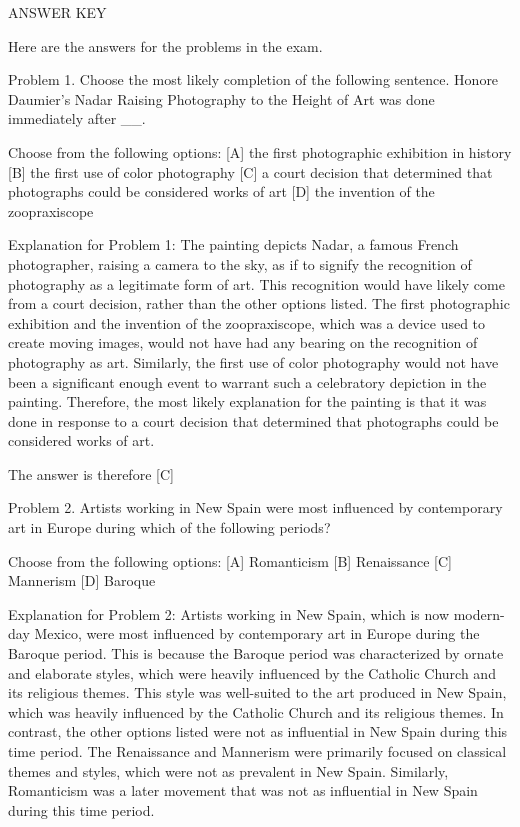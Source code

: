 \documentclass{article}
\begin{document}
\begin{monobox}
ANSWER KEY

Here are the answers for the problems in the exam.

Problem 1.
Choose the most likely completion of the following sentence. Honore Daumier’s Nadar Raising Photography to the Height of Art was done immediately after \_\_.

Choose from the following options:
[A] the first photographic exhibition in history
[B] the first use of color photography
[C] a court decision that determined that photographs could be considered works of art
[D] the invention of the zoopraxiscope

Explanation for Problem 1: The painting depicts Nadar, a famous French photographer, raising a camera to the sky, as if to signify the recognition of photography as a legitimate form of art. This recognition would have likely come from a court decision, rather than the other options listed. The first photographic exhibition and the invention of the zoopraxiscope, which was a device used to create moving images, would not have had any bearing on the recognition of photography as art. Similarly, the first use of color photography would not have been a significant enough event to warrant such a celebratory depiction in the painting. Therefore, the most likely explanation for the painting is that it was done in response to a court decision that determined that photographs could be considered works of art.

The answer is therefore [C]

Problem 2.
Artists working in New Spain were most influenced by contemporary art in Europe during which of the following periods?

Choose from the following options:
[A] Romanticism
[B] Renaissance
[C] Mannerism
[D] Baroque

Explanation for Problem 2: Artists working in New Spain, which is now modern-day Mexico, were most influenced by contemporary art in Europe during the Baroque period. This is because the Baroque period was characterized by ornate and elaborate styles, which were heavily influenced by the Catholic Church and its religious themes. This style was well-suited to the art produced in New Spain, which was heavily influenced by the Catholic Church and its religious themes. In contrast, the other options listed were not as influential in New Spain during this time period. The Renaissance and Mannerism were primarily focused on classical themes and styles, which were not as prevalent in New Spain. Similarly, Romanticism was a later movement that was not as influential in New Spain during this time period.


\end{monobox}
\end{document}
